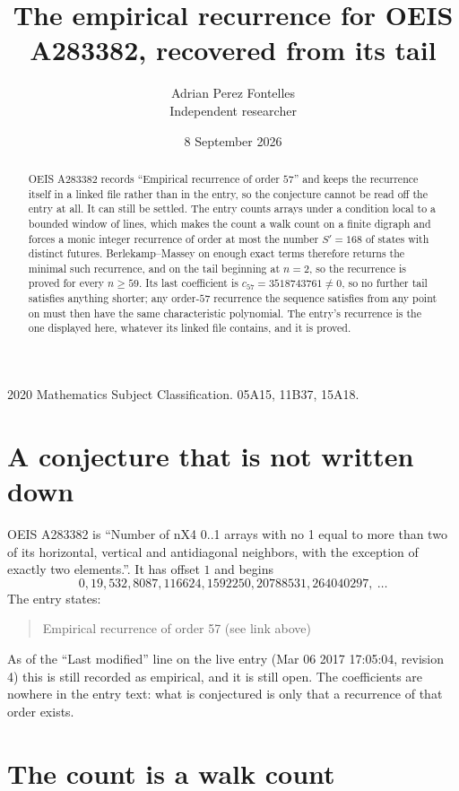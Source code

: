\documentclass[11pt,a4paper]{article}
\title{The empirical recurrence for OEIS A283382, recovered from its tail}
\author{Adrian Perez Fontelles\\ \small Independent researcher}
\date{8 September 2026}
\theoremstyle{plain}
\theoremstyle{definition}
\begin{document}
\maketitle

\begin{abstract}
OEIS A283382 records ``Empirical recurrence of order $57$'' and keeps the recurrence itself in
a linked file rather than in the entry, so the conjecture cannot be read off the entry at all.
It can still be settled. The entry counts arrays under a condition local to a bounded window of
lines, which makes the count a walk count on a finite digraph and forces a monic integer
recurrence of order at most the number $S'=168$ of states with distinct futures. Berlekamp--Massey on
enough exact terms therefore returns the minimal such recurrence, and on the tail beginning at $n=2$, so the recurrence is proved for every $n\ge59$.
Its last coefficient is $c_{57}=3518743761\neq0$, so no further tail satisfies anything
shorter; any order-$57$ recurrence the sequence satisfies from any point on must then have
the same characteristic polynomial. The entry's recurrence is the one displayed here, whatever
its linked file contains, and it is proved.
\end{abstract}

\noindent\small 2020 Mathematics Subject Classification. 05A15, 11B37, 15A18.\normalsize

\section{A conjecture that is not written down}

OEIS A283382 is ``Number of nX4 0..1 arrays with no 1 equal to more than two of its horizontal, vertical and antidiagonal neighbors, with the exception of exactly two elements.''. It has offset $1$ and begins
\[
0, 19, 532, 8087, 116624, 1592250, 20788531, 264040297,\ \dots
\]
The entry states:
\begin{quote}
Empirical recurrence of order 57 (see link above)
\end{quote}
As of the ``Last modified'' line on the live entry (Mar 06 2017 17:05:04, revision 4)
this is still recorded as empirical, and it is still open. The coefficients are nowhere in the
entry text: what is conjectured is only that a recurrence of that order exists.

\section{The count is a walk count}
\end{document}
